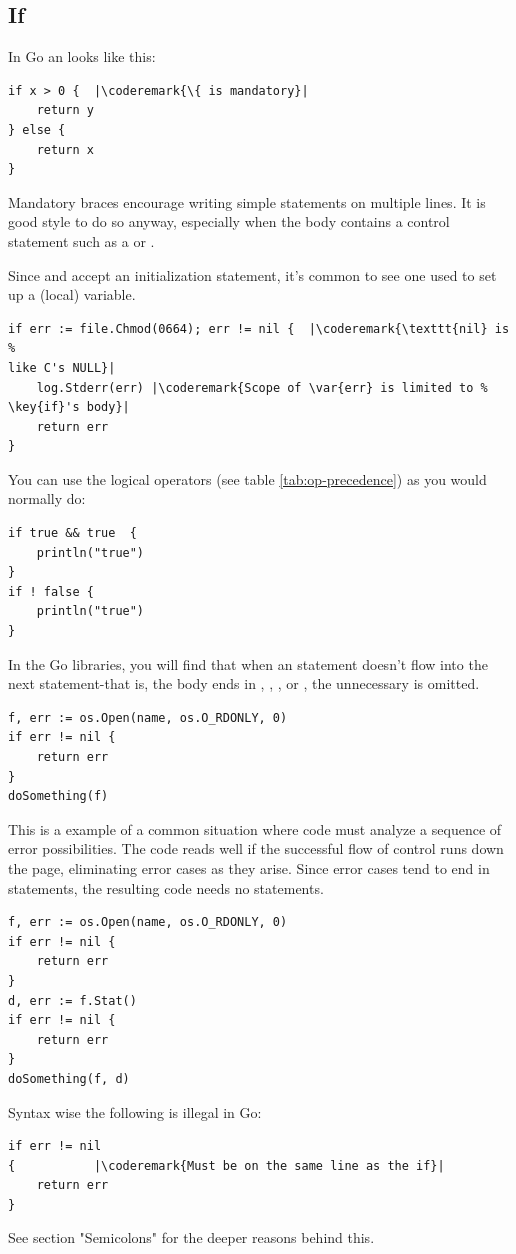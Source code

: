 \subsection{If}
In Go an  looks like this:
\begin{lstlisting}
if x > 0 {	|\coderemark{\{ is mandatory}|
    return y
} else {
    return x
}
\end{lstlisting}
Mandatory braces encourage writing simple  statements on multiple
lines. It is good style to do so anyway, especially when the body
contains a control statement such as a
 or
.

Since  and  accept an initialization statement, it's common to
see one used to set up a (local) variable.
\begin{lstlisting}
if err := file.Chmod(0664); err != nil {  |\coderemark{\texttt{nil} is %
like C's NULL}|
    log.Stderr(err) |\coderemark{Scope of \var{err} is limited to %
\key{if}'s body}|
    return err
}
\end{lstlisting}
You can use the logical operators (see table \ref{tab:op-precedence}) as
you would normally do:
\begin{lstlisting}
if true && true  {
    println("true")
}
if ! false {
    println("true")
}
\end{lstlisting}

In the Go libraries, you will find that when an  statement doesn't flow
into the next statement-that is, the body ends in ,
, ,
or , the unnecessary  is omitted.

\begin{lstlisting}
f, err := os.Open(name, os.O_RDONLY, 0)
if err != nil {
    return err
}
doSomething(f)
\end{lstlisting}
This is a example of a common situation where code must analyze a
sequence of error possibilities. The code reads well if the successful
flow of control runs down the page, eliminating error cases as they
arise. Since error cases tend to end in  statements, the resulting
code needs no  statements.
\begin{lstlisting}
f, err := os.Open(name, os.O_RDONLY, 0)
if err != nil {
    return err
}
d, err := f.Stat()
if err != nil {
    return err
}
doSomething(f, d)
\end{lstlisting}
Syntax wise the following is illegal in Go:
\begin{lstlisting}
if err != nil
{		    |\coderemark{Must be on the same line as the if}|
    return err
}
\end{lstlisting}
See \cite{effective_go} section "Semicolons" for the deeper reasons
behind this.

